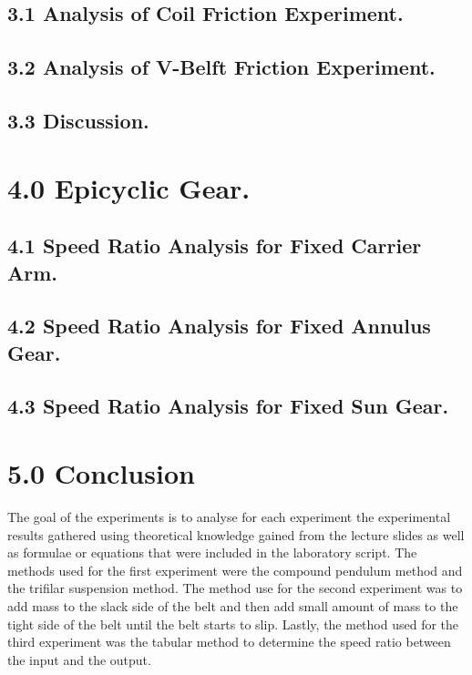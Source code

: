 \documentclass[12pt,a4paper]{report}
\begin{document}
\subsection*{3.1 Analysis of Coil Friction Experiment.}



\subsection*{3.2 Analysis of V-Belft Friction Experiment.}

\subsection*{3.3 Discussion.}


\section*{4.0 Epicyclic Gear.}

\subsection*{4.1 Speed Ratio Analysis for Fixed Carrier Arm.}

\subsection*{4.2 Speed Ratio Analysis for Fixed Annulus Gear.}

\subsection*{4.3 Speed Ratio Analysis for Fixed Sun Gear.}

\section*{5.0 Conclusion}
The goal of the experiments is to analyse for each experiment the experimental results gathered using theoretical knowledge gained from the lecture slides as well as formulae or equations that were included in the laboratory script. The methods used for the first experiment were the compound pendulum method and the trifilar suspension method. The method use for the second
experiment was to add mass to the slack side of the belt and then add small amount of mass to the tight side of the belt until the belt starts to slip. Lastly, the method used for the third experiment was the tabular method to determine the speed ratio between the input and the output.\\
\end{document}
